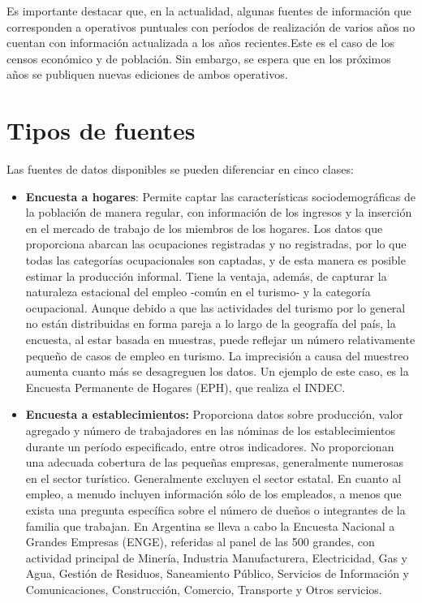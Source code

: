 \documentclass[
  openany]{book}
\begin{document}
Es importante destacar que, en la actualidad, algunas fuentes de información que corresponden a operativos puntuales con períodos de realización de varios años no cuentan con información actualizada a los años recientes.Este es el caso de los censos económico y de población. Sin embargo, se espera que en los próximos años se publiquen nuevas ediciones de ambos operativos.

\hypertarget{tipos-de-fuentes}{%
\section{Tipos de fuentes}\label{tipos-de-fuentes}}

Las fuentes de datos disponibles se pueden diferenciar en cinco clases:

\begin{itemize}
\item
  \textbf{Encuesta a hogares}: Permite captar las características sociodemográficas de la población de manera regular, con información de los ingresos y la inserción en el mercado de trabajo de los miembros de los hogares.
  Los datos que proporciona abarcan las ocupaciones registradas y no registradas, por lo que todas las categorías ocupacionales son captadas, y de esta manera es posible estimar la producción informal.
  Tiene la ventaja, además, de capturar la naturaleza estacional del empleo -común en el turismo- y la categoría ocupacional.
  Aunque debido a que las actividades del turismo por lo general no están distribuidas en forma pareja a lo largo de la geografía del país, la encuesta, al estar basada en muestras, puede reflejar un número relativamente pequeño de casos de empleo en turismo.
  La imprecisión a causa del muestreo aumenta cuanto más se desagreguen los datos.
  Un ejemplo de este caso, es la Encuesta Permanente de Hogares (EPH), que realiza el INDEC.
\item
  \textbf{Encuesta a establecimientos:} Proporciona datos sobre producción, valor agregado y número de trabajadores en las nóminas de los establecimientos durante un período especificado, entre otros indicadores.
  No proporcionan una adecuada cobertura de las pequeñas empresas, generalmente numerosas en el sector turístico.
  Generalmente excluyen el sector estatal.
  En cuanto al empleo, a menudo incluyen información sólo de los empleados, a menos que exista una pregunta específica sobre el número de dueños o integrantes de la familia que trabajan.
  En Argentina se lleva a cabo la Encuesta Nacional a Grandes Empresas (ENGE), referidas al panel de las 500 grandes, con actividad principal de Minería, Industria Manufacturera, Electricidad, Gas y Agua, Gestión de Residuos, Saneamiento Público, Servicios de Información y Comunicaciones, Construcción, Comercio, Transporte y Otros servicios.

\end{itemize}
\end{document}
